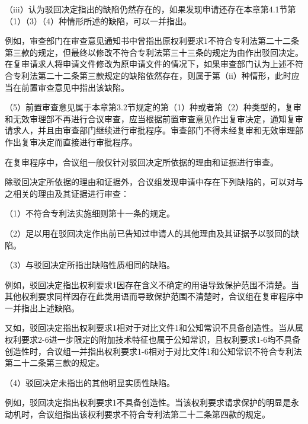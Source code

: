 {\setlength{\parindent}{17.1bp}（iii）认为驳回决定指出的缺陷仍然存在的，如果发现申请还存在本章第4.1节第（1）（3）（4）种情形所述的缺陷，可以一并指出。\par}

例如，审查部门在审查意见通知书中曾指出原权利要求1不符合专利法第二十二条第三款的规定，但最终以修改不符合专利法第三十三条的规定为由作出驳回决定。在复审请求人将申请文件修改为原申请文件的情况下，如果审查部门认为上述不符合专利法第二十二条第三款规定的缺陷依然存在，则属于第（ii）种情形，此时应当在前置审查意见中指出该缺陷。

{\setlength{\parindent}{17.1bp}（5）前置审查意见属于本章第3.2节规定的第（1）种或者第（2）种类型的，复审和无效审理部不再进行合议审查，应当根据前置审查意见作出复审决定，通知复审请求人，并且由审查部门继续进行审批程序。审查部门不得未经复审和无效审理部作出复审决定而直接进行审批程序。\par}

在复审程序中，合议组一般仅针对驳回决定所依据的理由和证据进行审查。

除驳回决定所依据的理由和证据外，合议组发现申请中存在下列缺陷的，可以对与之相关的理由及其证据进行审查：

{\setlength{\parindent}{17.1bp}（1）不符合专利法实施细则第十一条的规定。\par}

{\setlength{\parindent}{17.1bp}（2）足以用在驳回决定作出前已告知过申请人的其他理由及其证据予以驳回的缺陷。\par}

{\setlength{\parindent}{17.1bp}（3）与驳回决定所指出缺陷性质相同的缺陷。\par}

例如，驳回决定指出权利要求1因存在含义不确定的用语导致保护范围不清楚。当其他权利要求同样因存在此类用语而导致保护范围不清楚时，合议组在复审程序中一并指出上述缺陷。

又如，驳回决定指出权利要求1相对于对比文件1和公知常识不具备创造性。当从属权利要求2-6进一步限定的附加技术特征也属于公知常识，且权利要求1-6均不具备创造性时，合议组一并指出权利要求1-6相对于对比文件1和公知常识不符合专利法第二十二条第三款的规定。

{\setlength{\parindent}{17.1bp}（4）驳回决定未指出的其他明显实质性缺陷。\par}

例如，驳回决定指出权利要求1不具备创造性。当该权利要求请求保护的明显是永动机时，合议组指出该权利要求不符合专利法第二十二条第四款的规定。

